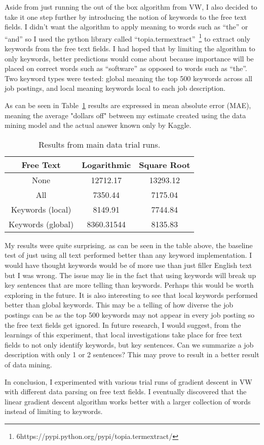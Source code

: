 \documentclass[conference]{IEEEtran}
\begin{document}
Aside from just running the out of the box algorithm
from VW, I also decided to take it one step further by introducing the notion of keywords to the free text fields. I didn't
want the algorithm to apply meaning to words such as ``the'' or ``and'' so I used the python library called 
``topia.termextract''~\footnote{6https://pypi.python.org/pypi/topia.termextract/}
to extract only keywords from the free text fields. I had hoped that by limiting the algorithm to only keywords, better
predictions would come about because importance will be placed on correct words such as ``software'' as opposed to words such as
``the''. Two keyword types were tested: global meaning the top 500 keywords across all job postings, and local meaning keywords
local to each job description.

As can be seen in Table~\ref{tab:results} results are expressed in
mean absolute error (MAE), meaning the average "dollars oﬀ" between my estimate created using
the data mining model and the actual answer known only by Kaggle.

\begin{table}[h]
\begin{center}
\begin{tabular}{| c | c | c |}
\hline
Free Text & Logarithmic & Square Root \\
\hline
\hline
None & 12712.17 & 13293.12 \\ \hline
All & 7350.44 & 7175.04 \\ \hline
Keywords (local) & 8149.91 & 7744.84 \\ \hline
Keywords (global) & 8360.31544 & 8135.83 \\ \hline
\end{tabular}
\end{center}
\caption{Results from main data trial runs.\label{tab:results}}
\end{table}

My results were quite surprising. as can be seen in the table above, the baseline test of just
using all text performed better than any keyword implementation. I would have thought keywords
would be of more use than just filler English text but I was wrong. The issue may lie in
the fact that using keywords will break up key sentences that are more telling
than keywords. Perhaps this would be worth exploring in the future. It is also interesting
to see that local keywords performed better than global keywords. This may be a telling of 
how diverse the job postings can be as the top 500 keywords may not appear in every job
posting so the free text fields get ignored. In future research, I would suggest, from
the learnings of this experiment, that local investigations take place for free text fields
to not only identify keywords, but key sentences. Can we summarize a job description with only
1 or 2 sentences? This may prove to result in a better result of data mining.

In conclusion, I experimented with various trial runs of gradient descent in
VW with different data parsing on free text fields. I eventually discovered
that the linear gradient descent algorithm works better with a larger collection
of words instead of limiting to keywords.

\end{document}
